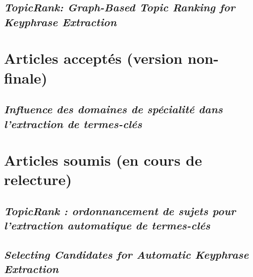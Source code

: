 \documentclass{rapport-suivi-LINA}
\begin{document}
      \section{\textit{TopicRank: Graph-Based Topic Ranking for Keyphrase
               Extraction}}
      \label{sec:ijcnlp2013}
        

    \chapter{Articles acceptés (version non-finale)}
      \section{\textit{Influence des domaines de spécialité dans l'extraction de
               termes-clés}}
      \label{sec:taln2014}
        

    \chapter{Articles soumis (en cours de relecture)}
      \section{\textit{TopicRank : ordonnancement de sujets pour l'extraction
               automatique de termes-clés}}
      \label{sec:tal2014}
        

      \section{\textit{Selecting Candidates for Automatic Keyphrase Extraction}}
      \label{sec:coling2014}
        
\end{document}
